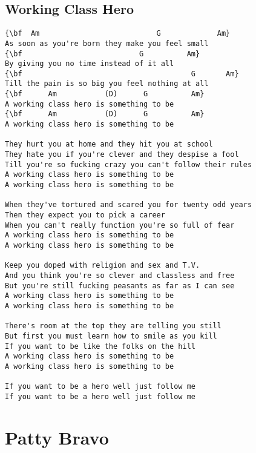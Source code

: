 \documentclass[a4paper]{article}
\begin{document}
\subsection{Working Class Hero}
\begin{Verbatim}[commandchars=\\\{\}]
{\bf  Am                           G             Am}
As soon as you're born they make you feel small
{\bf                           G          Am}
By giving you no time instead of it all
{\bf                                       G       Am}
Till the pain is so big you feel nothing at all
{\bf      Am           (D)      G          Am}
A working class hero is something to be
{\bf      Am           (D)      G          Am}
A working class hero is something to be

They hurt you at home and they hit you at school
They hate you if you're clever and they despise a fool
Till you're so fucking crazy you can't follow their rules
A working class hero is something to be
A working class hero is something to be

When they've tortured and scared you for twenty odd years
Then they expect you to pick a career
When you can't really function you're so full of fear
A working class hero is something to be
A working class hero is something to be

Keep you doped with religion and sex and T.V.
And you think you're so clever and classless and free
But you're still fucking peasants as far as I can see
A working class hero is something to be
A working class hero is something to be

There's room at the top they are telling you still
But first you must learn how to smile as you kill
If you want to be like the folks on the hill
A working class hero is something to be
A working class hero is something to be

If you want to be a hero well just follow me
If you want to be a hero well just follow me

\end{Verbatim}
\newpage
\section{Patty Bravo}
\end{document}

